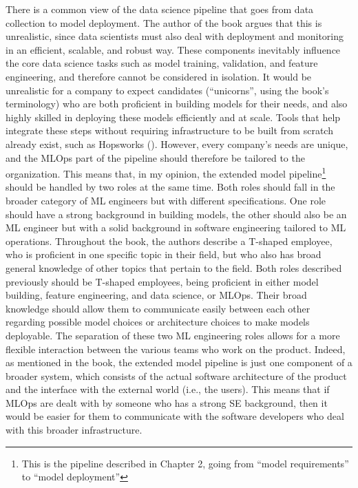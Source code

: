 There is a common view of the data science pipeline that goes from data collection to model deployment. The author of the book argues that this is unrealistic, since data scientists must also deal with deployment and monitoring in an efficient, scalable, and robust way. These components inevitably influence the core data science tasks such as model training, validation, and feature engineering, and therefore cannot be considered in isolation. It would be unrealistic for a company to expect candidates (“unicorns”, using the book's terminology) who are both proficient in building models for their needs, and also highly skilled in deploying these models efficiently and at scale. Tools that help integrate these steps without requiring infrastructure to be built from scratch already exist, such as Hopsworks (\cite{Hopsworks}). However, every company’s needs are unique, and the MLOps part of the pipeline should therefore be tailored to the organization. This means that, in my opinion, the extended model pipeline\footnote{This is the pipeline described in Chapter 2, going from “model requirements” to “model deployment”} should be handled by two roles at the same time. Both roles should fall in the broader category of ML engineers but with different specifications. One role should have a strong background in building models, the other should also be an ML engineer but with a solid background in software engineering tailored to ML operations. Throughout the book, the authors describe a T-shaped employee, who is proficient in one specific topic in their field, but who also has broad general knowledge of other topics that pertain to the field. Both roles described previously should be T-shaped employees, being proficient in either model building, feature engineering, and data science, or MLOps. Their broad knowledge should allow them to communicate easily between each other regarding possible model choices or architecture choices to make models deployable. The separation of these two ML engineering roles allows for a more flexible interaction between the various teams who work on the product. Indeed, as mentioned in the book, the extended model pipeline is just one component of a broader system, which consists of the actual software architecture of the product and the interface with the external world (i.e., the users). This means that if MLOps are dealt with by someone who has a strong SE background, then it would be easier for them to communicate with the software developers who deal with this broader infrastructure. 
